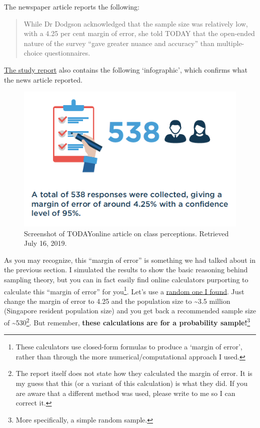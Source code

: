 \documentclass[openany]{book}
\let\rmarkdownfootnote\footnote%
\def\footnote{\protect\rmarkdownfootnote}
\begin{document}
The newspaper article reports the following:

\begin{quote}
While Dr Dodgson acknowledged that the sample size was relatively low,
with a 4.25 per cent margin of error, she told TODAY that the open-ended
nature of the survey ``gave greater nuance and accuracy'' than
multiple-choice questionnaires.
\end{quote}

\href{https://lkyspp.nus.edu.sg/docs/default-source/gia-documents/cars_-condos-and-cai-png-survey-(high-res).pdf}{The
study report} also contains the following `infographic', which confirms
what the news article reported.

\begin{figure}

{\centering \includegraphics[width=0.6\linewidth]{images/samples/lkyspp_reportsample} 

}

\caption{Screenshot of TODAYonline article on class perceptions. Retrieved July 16, 2019.}\label{fig:today-reportsample}
\end{figure}

As you may recognize, this ``margin of error'' is something we had
talked about in the previous section. I simulated the results to show
the basic reasoning behind sampling theory, but you can in fact easily
find online calculators purporting to calculate this ``margin of error''
for you\footnote{These calculators use closed-form formulas to produce a
  `margin of error', rather than through the more
  numerical/computational approach I used.}. Let's use a
\href{http://www.raosoft.com/samplesize.html}{random one I found}. Just
change the margin of error to 4.25 and the population size to
\textasciitilde{}3.5 million (Singapore resident population size) and
you get back a recommended sample size of \textasciitilde{}530\footnote{The
  report itself does not state how they calculated the margin of error.
  It is my guess that this (or a variant of this calculation) is what
  they did. If you are aware that a different method was used, please
  write to me so I can correct it.}. But remember, \textbf{these
calculations are for a probability sample!}\footnote{More specifically,
  a simple random sample.}
\end{document}
